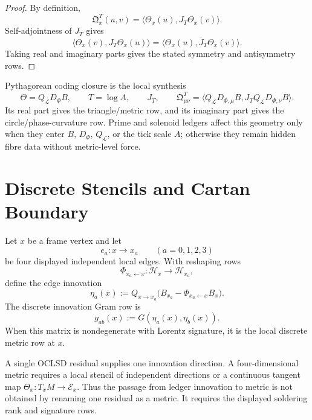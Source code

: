 \begin{proof}
By definition,
$$
\mathfrak Q^T_x(u,v)
=
\langle
\Theta_x(u),
J_T\Theta_x(v)
\rangle.
$$
Self-adjointness of $J_T$ gives
$$
\langle
\Theta_x(v),
J_T\Theta_x(u)
\rangle
=
\overline{
\langle
\Theta_x(u),
J_T\Theta_x(v)
\rangle
}.
$$
Taking real and imaginary parts gives the stated symmetry and
antisymmetry rows.
\end{proof}

\begin{principle}
\label{prin:innovation-soldering-pcc-boundary}
Pythagorean coding closure is the local synthesis
$$
\Theta=Q_{\mathcal L}D_{\Phi}B,
\qquad
T=\log A,
\qquad
J_T,
\qquad
\mathfrak Q^T_{\mu\nu}
=
\langle Q_{\mathcal L}D_{\Phi,\mu}B,
J_TQ_{\mathcal L}D_{\Phi,\nu}B\rangle.
$$
Its real part gives the triangle/metric row, and its imaginary part gives
the circle/phase-curvature row. Prime and solenoid ledgers affect this
geometry only when they enter $B$, $D_{\Phi}$, $Q_{\mathcal L}$, or the
tick scale $A$; otherwise they remain hidden fibre data without
metric-level force.
\end{principle}

\section{Discrete Stencils and Cartan Boundary}
\label{sec:innovation-soldering-discrete-stencils-cartan}

\begin{definition}
\label{def:innovation-soldering-discrete-stencil}
Let $x$ be a frame vertex and let
$$
e_a:x\to x_a
\qquad
(a=0,1,2,3)
$$
be four displayed independent local edges. With reshaping rows
$$
\Phi_{x_a\leftarrow x}:\mathcal H_x\to\mathcal H_{x_a},
$$
define the edge innovation
$$
\eta_a(x)
:=
Q_{x\to x_a}
\bigl(
B_{x_a}-\Phi_{x_a\leftarrow x}B_x
\bigr).
$$
The discrete innovation Gram row is
$$
g_{ab}(x):=G(\eta_a(x),\eta_b(x)).
$$
When this matrix is nondegenerate with Lorentz signature, it is the
local discrete metric row at $x$.
\end{definition}

\begin{principle}
\label{prin:innovation-soldering-one-tick-not-full-metric}
A single OCLSD residual supplies one innovation direction. A
four-dimensional metric requires a local stencil of independent
directions or a continuous tangent map $\Theta_x:T_xM\to\mathcal E_x$.
Thus the passage from ledger innovation to metric is not obtained by
renaming one residual as a metric. It requires the displayed soldering
rank and signature rows.
\end{principle}

